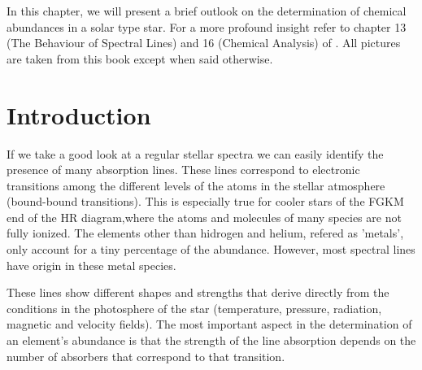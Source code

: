 \documentclass[dvips,12pt,a4paper]{report}
\begin{document}
{\indent In this chapter, we will present a brief outlook on the determination of chemical abundances in a solar type star. For a more profound insight refer to chapter 13 (The Behaviour of Spectral Lines) and 16 (Chemical Analysis) of \citet{Gray-2005}. All pictures are taken from this book except when said otherwise.

\section{Introduction}

If we take a good look at a regular stellar spectra we can easily identify the presence of many absorption lines. These lines correspond to electronic transitions among the different levels of the atoms in the stellar atmosphere (bound-bound transitions). This is especially true for cooler stars of the FGKM end of the HR diagram,where the atoms and molecules of many species are not fully ionized. %
The elements other than hidrogen and helium, refered as 'metals', only account for a tiny percentage of the abundance. However, most spectral lines have origin in these metal species.

These lines show different shapes and strengths that derive directly from the conditions in the photosphere of the star (temperature, pressure, radiation, magnetic and velocity fields). %
The most important aspect in the determination of an element's abundance is that the strength of the line absorption depends on the number of absorbers that correspond to that transition.  


}
\end{document}
